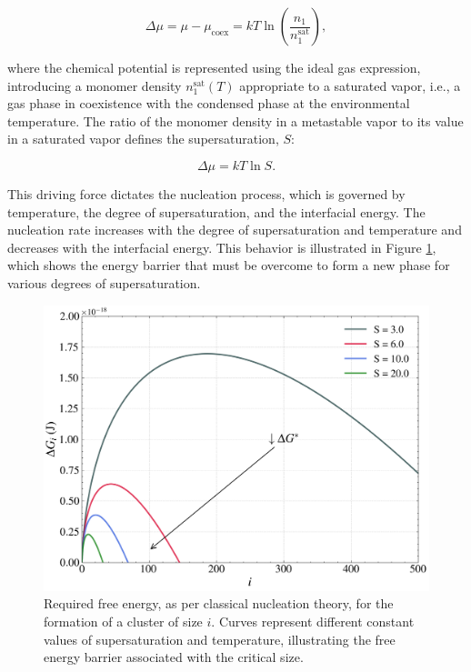 \begin{equation}
    \Delta\mu = \mu - \mu_{\text{coex}} = kT \ln\left(\frac{n_1}{n_1^{\text{sat}}}\right),
\end{equation}

where the chemical potential is represented using the ideal gas expression, introducing a monomer density \(n_1^{\text{sat}}(T)\) appropriate to a saturated vapor, i.e., a gas phase in coexistence with the condensed phase at the environmental temperature. The ratio of the monomer density in a metastable vapor to its value in a saturated vapor defines the supersaturation, \(S\):

\begin{equation}
    \Delta\mu = kT \ln S.
\end{equation}

This driving force dictates the nucleation process, which is governed by temperature, the degree of supersaturation, and the interfacial energy. The nucleation rate increases with the degree of supersaturation and temperature and decreases with the interfacial energy. This behavior is illustrated in Figure \ref{fig:free_energy_illustrative_degree_saturation}, which shows the energy barrier that must be overcome to form a new phase for various degrees of supersaturation.

\begin{figure}[H]
    \centering
    \includegraphics[width=0.9\linewidth]{free_energy_illustrative_degree_saturation.png}
    \caption{Required free energy, as per classical nucleation theory, for the formation of a cluster of size \(i\). Curves represent different constant values of supersaturation and temperature, illustrating the free energy barrier associated with the critical size.}
    \label{fig:free_energy_illustrative_degree_saturation}
\end{figure}

